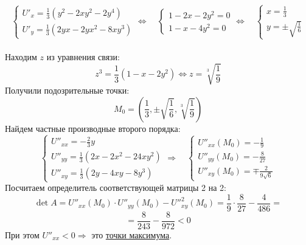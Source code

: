 \documentclass{article}
\begin{document}
\begin{equation*}
\begin{cases}
U'_x = \frac{1}{3} (y^2 - 2x y^2 - 2y^4) \\
U'_y = \frac{1}{3} (2y x - 2y x^2 - 8x y^3)
\end{cases}
\Leftrightarrow \quad
\begin{cases}
1 - 2x - 2y^2 = 0 \\
1 - x - 4y^2 = 0
\end{cases}
\Leftrightarrow \quad
\begin{cases}
x = \frac{1}{3} \\
y = \pm \sqrt{\frac{1}{6}}
\end{cases}
\end{equation*}\\
Находим $z$ из уравнения связи:
\[ z^3 = \frac{1}{3} (1 - x - 2y^2) \Leftrightarrow z = \sqrt[3]{\frac{1}{9}}\]
Получили подозрительные точки: \[M_0 = \left(\frac{1}{3}, \pm \sqrt{\frac{1}{6}}, \sqrt[3]{\frac{1}{9}}\right) \]
Найдем частные производные второго порядка: \\
\begin{equation*}
\begin{cases}
U''_{xx} = -\frac{2}{3} y \\
U''_{yy}  = \frac{1}{3} (2x - 2x^2 -24 x y^2) \\
U''_{xy} = \frac{1}{3} (2y - 4xy - 8y^3)
\end{cases}
\Rightarrow
\quad
\begin{cases}
U''_{xx} (M_0) = - \frac{1}{9} \\
U''_{yy} (M_0) = - \frac{8}{27} \\
U''_{xy} (M_0) = \mp \frac{2}{9\sqrt{6}}
\end{cases}
\end{equation*}
Посчитаем определитель соответствующей матрицы 2 на 2:  
\[ \det A = U''_{xx} (M_0) \cdot U''_{yy} (M_0) - U''^2_{xy} (M_0) = \frac{1}{9} \cdot \frac{8}{27} - \frac{4}{486} = \]
\[ = \frac{8}{243} - \frac{8}{972} < 0\]
При этом $U''_{xx} < 0 \Rightarrow$ это \underline{точки максимума}.
\\ \\
\end{document}

